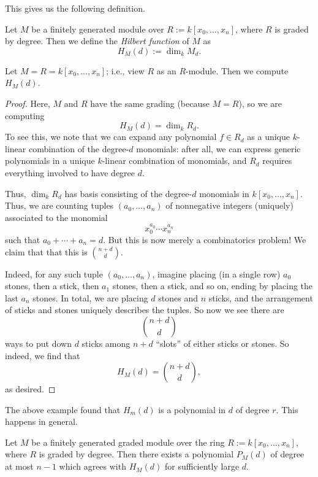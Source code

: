 This gives us the following definition.
\begin{definition}
	Let $M$ be a finitely generated module over $R:=k[x_0,\ldots,x_n]$, where $R$ is graded by degree. Then we define the \textit{Hilbert function} of $M$ as
	\[H_M(d):=\dim_kM_d.\]
\end{definition}
\begin{exe} \label{exe:hilbfuncex}
	Let $M=R=k[x_0,\ldots,x_n]$; i.e., view $R$ as an $R$-module. Then we compute $H_M(d)$.
\end{exe}
\begin{proof}
	Here, $M$ and $R$ have the same grading (because $M=R$), so we are computing
	\[H_M(d)=\dim_kR_d.\]
	To see this, we note that we can expand any polynomial $f\in R_d$ as a unique $k$-linear combination of the degree-$d$ monomials: after all, we can express generic polynomials in a unique $k$-linear combination of monomials, and $R_d$ requires everything involved to have degree $d$.

	Thus, $\dim_kR_d$ has basis consisting of the degree-$d$ monomials in $k[x_0,\ldots,x_n]$. Thus, we are counting tuples $(a_0,\ldots,a_n)$ of nonnegative integers (uniquely) associated to the monomial
	\[x_0^{a_0}\cdots x_n^{a_n}\]
	such that $a_0+\cdots+a_n=d$. But this is now merely a combinatorics problem! We claim that that this is $\binom{n+d}d$.
	
	Indeed, for any such tuple $(a_0,\ldots,a_n)$, imagine placing (in a single row) $a_0$ stones, then a stick, then $a_1$ stones, then a stick, and so on, ending by placing the last $a_n$ stones. In total, we are placing $d$ stones and $n$ sticks, and the arrangement of sticks and stones uniquely describes the tuples. So now we see there are
	\[\binom{n+d}d\]
	ways to put down $d$ sticks among $n+d$ ``slots'' of either sticks or stones. So indeed, we find that
	\[\boxed{H_M(d)=\binom{n+d}d},\]
	as desired.
\end{proof}
The above example found that $H_m(d)$ is a polynomial in $d$ of degree $r$. This happens in general.
\begin{theorem} \label{thm:hilbertpoly}
	Let $M$ be a finitely generated graded module over the ring $R:=k[x_0,\ldots,x_n]$, where $R$ is graded by degree. Then there exists a polynomial $P_M(d)$ of degree at most $n-1$ which agrees with $H_M(d)$ for sufficiently large $d$.
\end{theorem}
